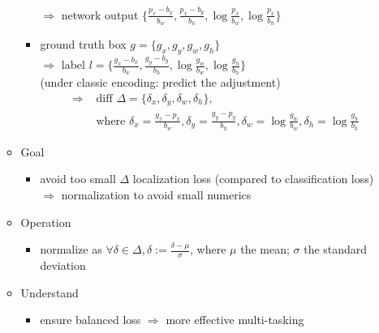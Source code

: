 \begin{itemize}
\begin{itemize}
\begin{itemize}
		$\Rightarrow$ network output $\{\frac{p_x-b_x}{b_w}, \frac{p_x-b_y}{b_h}, \log\frac{p_x}{b_w}, \log\frac{p_x}{b_h}\}$ \\
		\item ground truth box $g=\{g_x,g_y,g_w,g_h\}$ \\
		$\Rightarrow$ label $l=\{\frac{g_x-b_x}{b_w}, \frac{g_y-b_y}{b_h}, \log\frac{g_w}{b_w}, \log\frac{g_h}{b_h}\}$ \\
		(under classic encoding: predict the adjustment)
		\Item \begin{align*} \Rightarrow & \textstyle {\text{ diff } \Delta=\{ \delta_x, \delta_y, \delta_w, \delta_h \},} \\
		& \textstyle {\text{ where } \delta_x = \frac{g_x-p_x}{b_w}, \delta_y = \frac{g_y-p_y}{b_h}, \delta_w=\log\frac{g_w}{b_w}, \delta_h=\log\frac{g_h}{b_h}} \end{align*}
		\end{itemize}
	\item Goal
		\begin{itemize}
		\item avoid too small $\Delta$ localization loss (compared to classification loss) \\
		$\Rightarrow$ normalization to avoid small numerics
		\end{itemize}
	\item Operation
		\begin{itemize}
		\item normalize as $\forall \delta \in \Delta, \delta := \frac{\delta-\mu}{\sigma}$, where $\mu$ the mean; $\sigma$ the standard deviation
		\end{itemize}
	\item Understand
		\begin{itemize}
		\item ensure balanced loss  $\Rightarrow$ more effective multi-tasking
		\end{itemize}
	\end{itemize}
\end{itemize}

